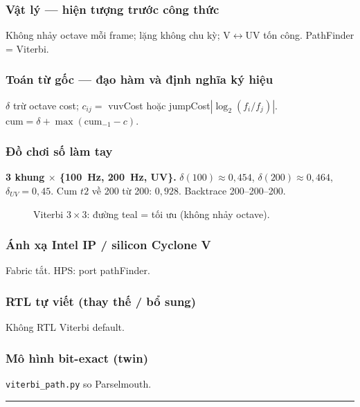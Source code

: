 \subsubsection*{Vật lý --- hiện tượng trước công thức}
Không nhảy octave mỗi frame; lặng không chu kỳ; V$\leftrightarrow$UV tốn công. PathFinder = Viterbi.
\subsubsection*{Toán từ gốc --- đạo hàm và định nghĩa ký hiệu}
$\delta$ trừ octave cost; $c_{ij}=$ vuvCost hoặc jumpCost$|\log_2(f_i/f_j)|$. $\mathrm{cum}=\delta+\max(\mathrm{cum}_{-1}-c)$.
\subsubsection*{Đồ chơi số làm tay}
\textbf{3 khung $\times$ \{100~Hz, 200~Hz, UV\}.} $\delta(100)\approx0{,}454$, $\delta(200)\approx0{,}464$, $\delta_{UV}=0{,}45$. Cum $t2$ về 200 từ 200: $0{,}928$. Backtrace 200--200--200.
\begin{figure}[H]\centering
{}
\caption{Viterbi $3\times3$: đường teal = tối ưu (không nhảy octave).}
\end{figure}
\subsubsection*{Ánh xạ Intel IP / silicon Cyclone V}
Fabric tắt. HPS: port pathFinder.
\subsubsection*{RTL tự viết (thay thế / bổ sung)}
Không RTL Viterbi default.
\subsubsection*{Mô hình bit-exact (twin)}
\texttt{viterbi\_path.py} so Parselmouth.
\vspace{0.4cm}\hrule\vspace{0.4cm}

\newpage
